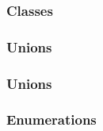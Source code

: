 \documentclass{article}
\begin{document}
\subsubsection{Classes}

\subsubsection{Unions}

\subsubsection{Unions}

\subsubsection{Enumerations}
%
\end{document}
